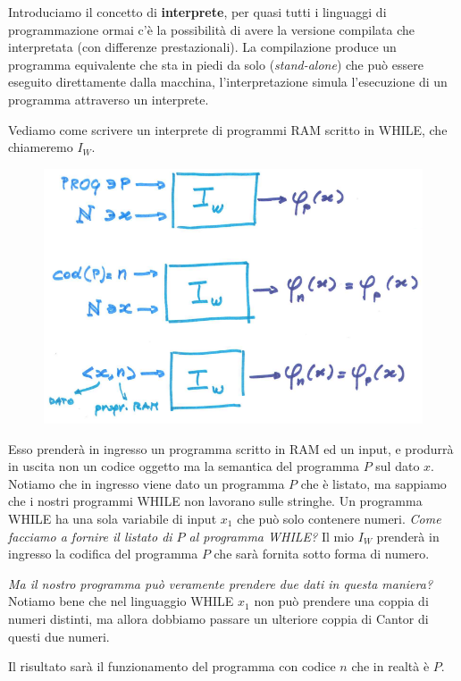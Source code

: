 \documentclass{article}
\begin{document}
Introduciamo il concetto di \textbf{interprete}, per quasi tutti i linguaggi di programmazione
ormai c'è la possibilità di avere la versione compilata che interpretata
(con differenze prestazionali).
La compilazione produce un programma equivalente che sta in piedi da solo (\textit{stand-alone})
che può essere eseguito direttamente dalla macchina, l'interpretazione simula l'esecuzione
di un programma attraverso un interprete.

Vediamo come scrivere un interprete di programmi RAM scritto in WHILE, che chiameremo $I_W$.

\begin{figure}[H]
    \centering
    \includegraphics[scale=0.5]{images/interprete_while.png}
\end{figure}
Esso prenderà in ingresso un programma scritto in RAM ed un input, e produrrà in uscita
non un codice oggetto ma la semantica del programma $P$ sul dato $x$. Notiamo che in ingresso
viene dato un programma $P$ che è listato, ma sappiamo che i nostri programmi WHILE non lavorano
sulle stringhe. Un programma WHILE ha una sola variabile di input $x_1$ che può solo contenere
numeri. \textit{Come facciamo a fornire il listato di $P$ al programma WHILE?} Il mio $I_W$
prenderà in ingresso la codifica del programma $P$ che sarà fornita sotto forma di numero.

\textit{Ma il nostro programma può veramente prendere due dati in questa maniera?} Notiamo bene
che nel linguaggio WHILE $x_1$ non può prendere una coppia di numeri distinti, ma allora
dobbiamo passare un ulteriore coppia di Cantor di questi due numeri.

Il risultato sarà il funzionamento del programma con codice $n$ che in realtà è $P$.
\end{document}
